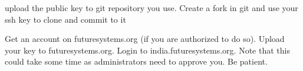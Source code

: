 \begin{exercise}
\label{E:SSH.2} upload the public key to git repository you use. Create a fork in
  git and use your ssh key to clone and commit to it
\end{exercise}

\begin{exercise}
\label{E:SSH.3} Get an account on futuresystems.org (if you are
  authorized to do so).  Upload your key to futuresystems.org. Login
  to india.futuresystems.org. Note that this could take some time as
  administrators need to approve you. Be patient.
\end{exercise}



